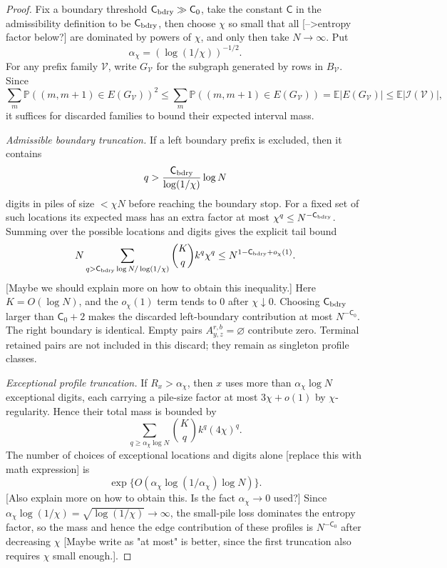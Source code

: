 \documentclass[11pt]{article}
\newcommand{\cI}{\mathcal I}
\newcommand{\E}{\mathbb E}
\newcommand{\Pbb}{\mathbb P}
\newcommand{\jscomment}[1]{\textup{\textsf{\color{blue}[#1]}}}
\begin{document}
\begin{proof}
Fix a boundary threshold \(\mathsf C_{\rm bdry}\gg \mathsf C_0\), take
the constant \(\mathsf C\) in the admissibility definition to be
\(\mathsf C_{\rm bdry}\), then choose
\(\chi\) so small that all \jscomment{-->entropy factor below?} are dominated by powers
of \(\chi\), and only then take \(N\to\infty\). Put
\[
    \alpha_\chi=(\log(1/\chi))^{-1/2}.
\]
For any prefix family \(\mathcal V\), write \(G_{\mathcal V}\) for the
subgraph generated by rows in \(B_{\mathcal V}\). Since
\[
    \sum_m \Pbb((m,m+1)\in E(G_{\mathcal V}))^2
    \le
    \sum_m \Pbb((m,m+1)\in E(G_{\mathcal V}))
    =
    \E |E(G_{\mathcal V})|
    \le
    \E |\cI(\mathcal V)| ,
\]
it suffices for discarded families to bound their expected interval mass.

\emph{Admissible boundary truncation.}
If a left boundary prefix is excluded, then it contains
\[
    q>\frac{\mathsf C_{\rm bdry}}{\log(1/\chi)}\log N
\]
digits in piles of size \(<\chi N\) before reaching the boundary stop.
For a fixed set of such locations its expected mass has an extra factor at
most \(\chi^q\le N^{-\mathsf C_{\rm bdry}}\). Summing over the possible
locations and digits gives the explicit tail bound
\[
    N\sum_{q>\mathsf C_{\rm bdry}\log N/\log(1/\chi)}
    \binom Kq k^q\chi^q
    \le
    N^{1-\mathsf C_{\rm bdry}+o_\chi(1)} .
\]
\jscomment{Maybe we should explain more on how to obtain this inequality.}
Here \(K=O(\log N)\), and the \(o_\chi(1)\) term tends to \(0\) after
\(\chi\downarrow0\). Choosing \(\mathsf C_{\rm bdry}\) larger than
\(\mathsf C_0+2\) makes the discarded left-boundary contribution at most
\(N^{-\mathsf C_0}\). The right boundary is identical. Empty pairs
\(A_{y,z}^{r,b}=\varnothing\) contribute zero. Terminal retained pairs are
not included in this discard; they remain as singleton profile classes.

\emph{Exceptional profile truncation.}
If \(R_x>\alpha_\chi\), then \(x\) uses more than
\(\alpha_\chi\log N\) exceptional digits, each carrying a pile-size factor
at most \(3\chi+o(1)\) by \(\chi\)-regularity. Hence their total mass is
bounded by
\[
    \sum_{q\ge\alpha_\chi\log N}\binom Kq k^q(4\chi)^q .
\]
The number of choices of exceptional locations and digits alone \jscomment{replace this with math expression} is
\[
    \exp\{O(\alpha_\chi\log(1/\alpha_\chi)\log N)\}.
\]
\jscomment{Also explain more on how to obtain this. Is the fact $\alpha_{\chi} \to 0$ used?}
Since
\(\alpha_\chi\log(1/\chi)=\sqrt{\log(1/\chi)}\to\infty\), the small-pile
loss dominates the entropy factor, so the mass and hence the edge
contribution of these profiles is \(N^{-\mathsf C_0}\) after decreasing
\(\chi\) \jscomment{Maybe write as "at most" is better, since the first truncation also requires $\chi$ small enough.}.


\end{proof}
\end{document}
